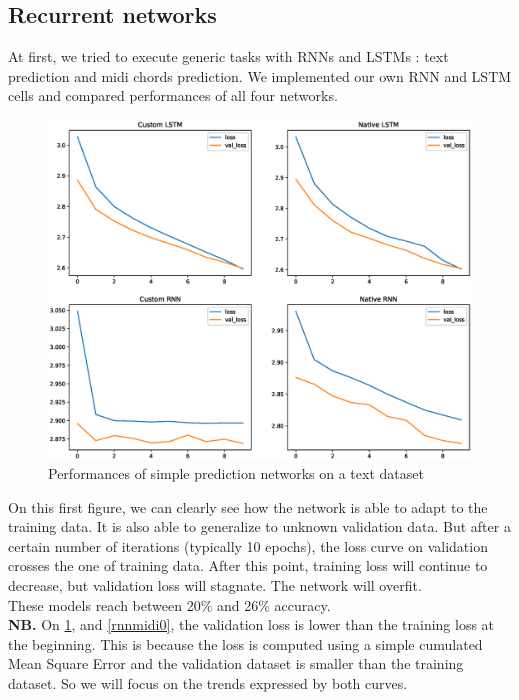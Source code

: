 \documentclass{article}
\begin{document}
\subsection{Recurrent networks}

At first, we tried to execute generic tasks with RNNs and LSTMs : text prediction and midi chords prediction. We implemented our own RNN and LSTM cells and compared performances of all four networks.

\begin{figure}[H]
\centering
\includegraphics[width =1\textwidth]{Ex2Sherlock.eps}
\caption{Performances of simple prediction networks on a text dataset}
\label{rnnstext}
\end{figure}

On this first figure, we can clearly see how the network is able to adapt to the training data. It is also able to generalize to unknown validation data. But after a certain number of iterations (typically 10 epochs), the loss curve on validation crosses the one of training data. After this point, training loss will continue to decrease, but validation loss will stagnate. The network will overfit. \\
These models reach between 20\% and 26\% accuracy. \\

\textbf{NB.} On \ref{rnnstext}, and \ref{rnnmidi0}, the validation loss is lower than the training loss at the beginning. This is because the loss is computed using a simple cumulated Mean Square Error and the validation dataset is smaller than the training dataset. So we will focus on the trends expressed by both curves.
\end{document}

